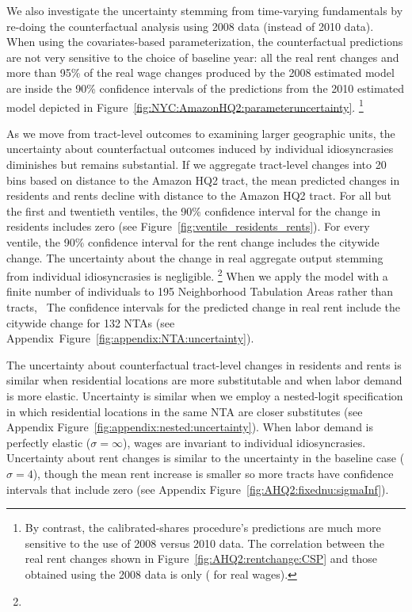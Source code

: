 \documentclass[11pt]{article}
\theoremstyle{definition}
\begin{document}
We also investigate the uncertainty stemming from time-varying fundamentals by re-doing the counterfactual analysis using 2008 data (instead of 2010 data).
When using the covariates-based parameterization, the counterfactual predictions are not very sensitive to the choice of baseline year:
all the real rent changes and more than 95\% of the real wage changes produced by the 2008 estimated model
are inside the 90\% confidence intervals of the predictions from the 2010 estimated model depicted in Figure~\ref{fig:NYC:AmazonHQ2:parameteruncertainty}.%
\footnote{%
	By contrast, the calibrated-shares procedure's predictions are much more sensitive to the use of 2008 versus 2010 data.
	The correlation between the real rent changes shown in Figure~\ref{fig:AHQ2:rentchange:CSP} and those obtained using the 2008 data is only  ( for real wages).
}

As we move from tract-level outcomes to examining larger geographic units,
the uncertainty about counterfactual outcomes induced by individual idiosyncrasies
diminishes but remains substantial.
If we aggregate tract-level changes into 20 bins based on distance to the Amazon HQ2 tract,
the mean predicted changes in residents and rents decline with distance to the Amazon HQ2 tract.
For all but the first and twentieth ventiles, the 90\% confidence interval for the change in residents includes zero (see Figure~\ref{fig:ventile_residents_rents}).
For every ventile, the 90\% confidence interval for the rent change includes the citywide change.
The uncertainty about the change in real aggregate output stemming from individual idiosyncrasies is negligible.%
\footnote{}
When we apply the model with a finite number of individuals to 195 Neighborhood Tabulation Areas rather than tracts,
\unskip\
The confidence intervals for the predicted change in real rent include the citywide change for 132 NTAs
(see Appendix~Figure~\ref{fig:appendix:NTA:uncertainty}).

The uncertainty about counterfactual tract-level changes in residents and rents is similar
when residential locations are more substitutable 
and 
when labor demand is more elastic.
Uncertainty is similar when we employ a nested-logit specification in which residential locations in the same NTA are closer substitutes 
(see Appendix Figure~\ref{fig:appendix:nested:uncertainty}).
When labor demand is perfectly elastic ($\sigma=\infty$), 
wages are invariant to individual idiosyncrasies.
Uncertainty about rent changes is similar to the uncertainty in the baseline case ($\sigma=4$),
though the mean rent increase is smaller so more tracts have confidence intervals that include zero
(see Appendix Figure~\ref{fig:AHQ2:fixednu:sigmaInf}).
\end{document}
